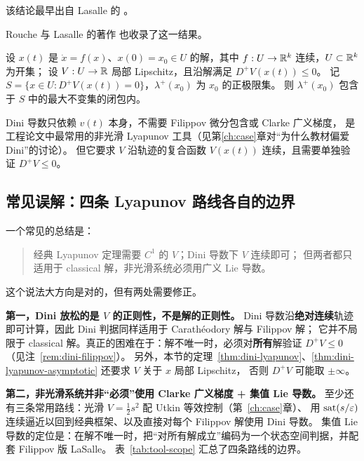 该结论最早出自 Lasalle 的 \cite[Theorem 2]{lasalleStabilityTheoryOrdinary1968}。\par
Rouche 与 Lasalle 的著作 \cite[p.~243]{roucheStabilityTheoryLiapunov1977} 也收录了这一结果。

\begin{lemma}\label{lem:nonsmooth-lasalle}
  设 $x(t)$ 是 $\dot{x}=f(x)$、$x(0)=x_0\in U$ 的解，其中 $f:U\to\mathbb{R}^k$ 连续，$U\subset\mathbb{R}^k$ 为开集；
  设 $V:U\to\mathbb{R}$ 局部 Lipschitz，且沿解满足 $D^+V(x(t))\le0$。
  记 $S=\{x\in U: D^+V(x(t))=0\}$，$\lambda^+(x_0)$ 为 $x_0$ 的正极限集。
  则 $\lambda^+(x_0)$ 包含于 $S$ 中的最大不变集的闭包内。
\end{lemma}

\begin{remark}
  Dini 导数只依赖 $v(t)$ 本身，不需要 Filippov 微分包含或 Clarke 广义梯度，
  是工程论文中最常用的非光滑 Lyapunov 工具（见第\ref{ch:case}章对“为什么教材偏爱 Dini”的讨论）。
  但它要求 $V$ 沿轨迹的复合函数 $V(x(t))$ 连续，且需要单独验证 $D^+V\le0$。
\end{remark}

\subsection{常见误解：四条 Lyapunov 路线各自的边界}\label{subsec:tool-scope}

一个常见的总结是：
\begin{quote}
经典 Lyapunov 定理需要 $C^1$ 的 $V$；Dini 导数下 $V$ 连续即可；
但两者都只适用于 classical 解，非光滑系统必须用广义 Lie 导数。
\end{quote}
这个说法大方向是对的，但有两处需要修正。

\textbf{第一，Dini 放松的是 $V$ 的正则性，不是解的正则性。}
Dini 导数沿\textbf{绝对连续}轨迹即可计算，因此 Dini 判据同样适用于 Carathéodory 解与 Filippov 解；
它并不局限于 classical 解。真正的困难在于：解不唯一时，必须对\textbf{所有}解验证 $D^+V\le0$（见注~\ref{rem:dini-filippov}）。
另外，本节的定理~\ref{thm:dini-lyapunov}、\ref{thm:dini-lyapunov-asymptotic} 还要求 $V$ 关于 $x$ 局部 Lipschitz，
否则 $D^+V$ 可能取 $\pm\infty$。

\textbf{第二，非光滑系统并非“必须”使用 Clarke 广义梯度 + 集值 Lie 导数。}
至少还有三条常用路线：光滑 $V=\frac12s^2$ 配 Utkin 等效控制（第~\ref{ch:case}章）、
用 $\operatorname{sat}(s/\varepsilon)$ 连续逼近以回到经典框架、以及直接对每个 Filippov 解使用 Dini 导数。
集值 Lie 导数的定位是：在解不唯一时，把“对所有解成立”编码为一个状态空间判据，并配套 Filippov 版 LaSalle。
表~\ref{tab:tool-scope} 汇总了四条路线的边界。


